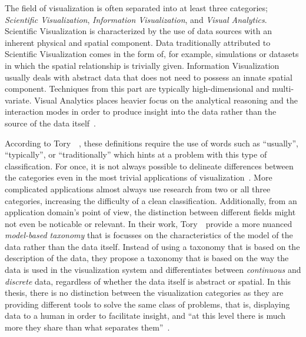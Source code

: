 The field of visualization is often separated into at least three categories;  \emph{Scientific Visualization}, \emph{Information Visualization}, and \emph{Visual Analytics}.  Scientific Visualization is characterized by the use of data sources with an inherent physical and spatial component.  Data traditionally attributed to Scientific Visualization comes in the form of, for example, simulations or datasets in which the spatial relationship is trivially given.  Information Visualization usually deals with abstract data that does not need to possess an innate spatial component.  Techniques from this part are typically high-dimensional and multi-variate.  Visual Analytics places heavier focus on the analytical reasoning and the interaction modes in order to produce insight into the data rather than the source of the data itself~\cite{wong2004guest}.

\noindent According to Tory~\etal~\cite{tory2002model}, these definitions require the use of words such as ``usually'', ``typically'', or ``traditionally'' which hints at a problem with this type of classification.  For once, it is not always possible to delineate differences between the categories even in the most trivial applications of visualization~\cite{rhyne2003information, weiskopf2006scivis}.  More complicated applications almost always use research from two or all three categories, increasing the difficulty of a clean classification.  Additionally, from an application domain's point of view, the distinction between different fields might not even be noticable or relevant.  In their work, Tory~\etal~provide a more nuanced \emph{model-based taxonomy} that is focusses on the characteristics of the model of the data rather than the data itself.  Instead of using a taxonomy that is based on the description of the data, they propose a taxonomy that is based on the way the data is used in the visualization system and differentiates between \emph{continuous} and \emph{discrete} data, regardless of whether the data itself is abstract or spatial.  In this thesis, there is no distinction between the visualization categories as they are providing different tools to solve the same class of problems, that is, displaying data to a human in order to facilitate insight, and ``at this level there is much more they share than what separates them''~\cite{van2006views}.

